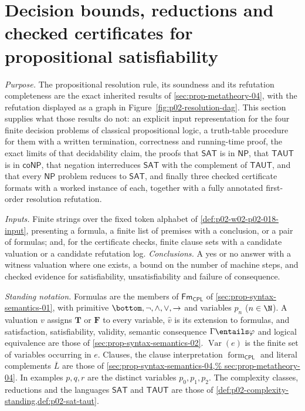 \section{Decision bounds, reductions and checked certificates for propositional satisfiability}
\label{sec:p02-w02-p02-018-decision-certificates}

\emph{Purpose.}  The propositional resolution rule, its soundness and its
refutation completeness are the exact inherited results of
\cref{sec:prop-metatheory-04}, with the refutation displayed as a graph in
Figure~\ref{fig:p02-resolution-dag}.  This section supplies what those results
do not: an explicit input representation for the four finite decision problems
of classical propositional logic, a truth-table procedure for them with a
written termination, correctness and running-time proof, the exact limits of
that decidability claim, the proofs that \(\mathsf{SAT}\) is in
\(\mathsf{NP}\), that \(\mathsf{TAUT}\) is in \(\mathsf{coNP}\), that negation
interreduces \(\mathsf{SAT}\) with the complement of \(\mathsf{TAUT}\), and
that every \(\mathsf{NP}\) problem reduces to \(\mathsf{SAT}\), and finally
three checked certificate formats with a worked instance of each, together
with a fully annotated first-order resolution refutation.

\emph{Inputs.}  Finite strings over the fixed token alphabet of
\cref{def:p02-w02-p02-018-input}, presenting a formula, a finite list of
premises with a conclusion, or a pair of formulas; and, for the certificate
checks, finite clause sets with a candidate valuation or a candidate
refutation log.  \emph{Conclusions.}  A yes or no answer with a witness
valuation where one exists, a bound on the number of machine steps, and
checked evidence for satisfiability, unsatisfiability and failure of
consequence.

\emph{Standing notation.}  Formulas are the members of
\(\mathsf{Fm}_{\mathsf{CPL}}\) of \cref{sec:prop-syntax-semantics-01}, with
primitive \(\bottom,\neg,\land,\lor,\to\) and variables \(p_n\)
(\(n\in\N\)).  A valuation \(v\) assigns \(\mathbf T\) or \(\mathbf F\) to
every variable, \(\widehat v\) is its extension to formulas, and
satisfaction, satisfiability, validity, semantic consequence
\(\Gamma\entails\varphi\) and logical equivalence are those of
\cref{sec:prop-syntax-semantics-02}.  \(\operatorname{Var}(e)\) is the finite
set of variables occurring in \(e\).  Clauses, the clause interpretation
\(\operatorname{form}_{\mathsf{CPL}}\) and literal complements
\(\overline L\) are those of \cref{sec:prop-syntax-semantics-04,%
sec:prop-metatheory-04}.  In examples \(p,q,r\) are the distinct variables
\(p_0,p_1,p_2\).  The complexity classes, reductions and the languages
\(\mathsf{SAT}\) and \(\mathsf{TAUT}\) are those of
\cref{def:p02-complexity-standing,def:p02-sat-taut}.

